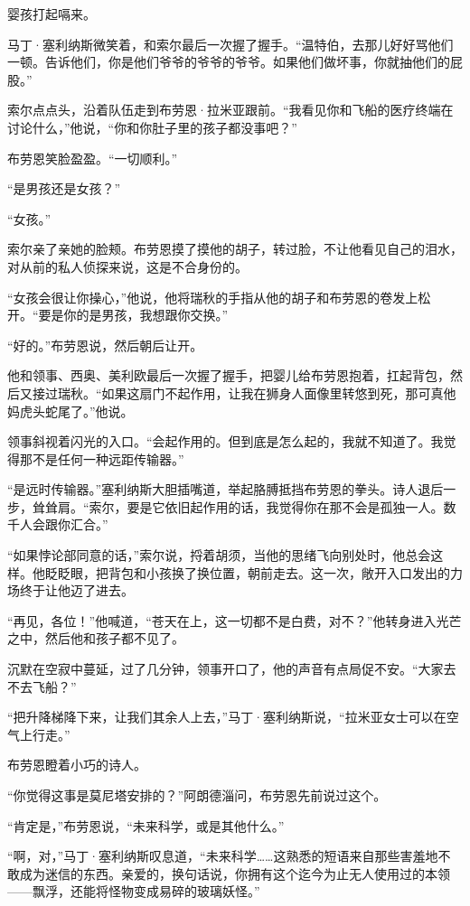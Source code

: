 \documentclass[AutoFakeBold=true]{book}
\begin{document}
婴孩打起嗝来。

马丁·塞利纳斯微笑着，和索尔最后一次握了握手。``温特伯，去那儿好好骂他们一顿。告诉他们，你是他们爷爷的爷爷的爷爷。如果他们做坏事，你就抽他们的屁股。''

索尔点点头，沿着队伍走到布劳恩·拉米亚跟前。``我看见你和飞船的医疗终端在讨论什么，''他说，``你和你肚子里的孩子都没事吧？''

布劳恩笑脸盈盈。``一切顺利。''

``是男孩还是女孩？''

``女孩。''

索尔亲了亲她的脸颊。布劳恩摸了摸他的胡子，转过脸，不让他看见自己的泪水，对从前的私人侦探来说，这是不合身份的。

``女孩会很让你操心，''他说，他将瑞秋的手指从他的胡子和布劳恩的卷发上松开。``要是你的是男孩，我想跟你交换。''

``好的。''布劳恩说，然后朝后让开。

他和领事、西奥、美利欧最后一次握了握手，把婴儿给布劳恩抱着，扛起背包，然后又接过瑞秋。``如果这扇门不起作用，让我在狮身人面像里转悠到死，那可真他妈虎头蛇尾了。''他说。

领事斜视着闪光的入口。``会起作用的。但到底是怎么起的，我就不知道了。我觉得那不是任何一种远距传输器。''

``是远时传输器。''塞利纳斯大胆插嘴道，举起胳膊抵挡布劳恩的拳头。诗人退后一步，耸耸肩。``索尔，要是它依旧起作用的话，我觉得你在那不会是孤独一人。数千人会跟你汇合。''

``如果悖论部同意的话，''索尔说，捋着胡须，当他的思绪飞向别处时，他总会这样。他眨眨眼，把背包和小孩换了换位置，朝前走去。这一次，敞开入口发出的力场终于让他迈了进去。

``再见，各位！''他喊道，``苍天在上，这一切都不是白费，对不？''他转身进入光芒之中，然后他和孩子都不见了。

\vspace*{1em}

沉默在空寂中蔓延，过了几分钟，领事开口了，他的声音有点局促不安。``大家去不去飞船？''

``把升降梯降下来，让我们其余人上去，''马丁·塞利纳斯说，``拉米亚女士可以在空气上行走。''

布劳恩瞪着小巧的诗人。

``你觉得这事是莫尼塔安排的？''阿朗德淄问，布劳恩先前说过这个。

``肯定是，''布劳恩说，``未来科学，或是其他什么。''

``啊，对，''马丁·塞利纳斯叹息道，``未来科学……这熟悉的短语来自那些害羞地不敢成为迷信的东西。亲爱的，换句话说，你拥有这个迄今为止无人使用过的本领——飘浮，还能将怪物变成易碎的玻璃妖怪。''
\end{document}
